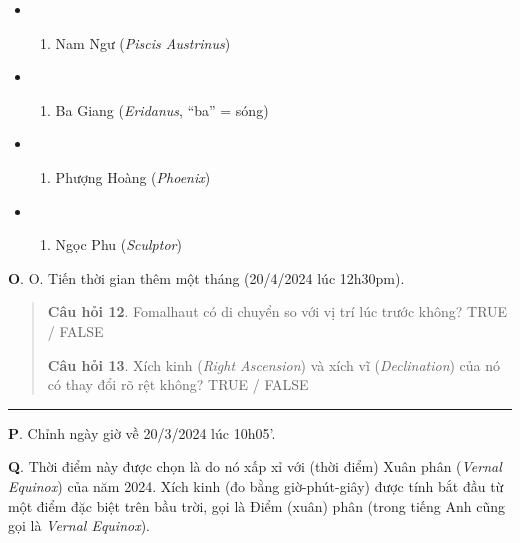 \documentclass[
  a4paper,
]{book}
\providecommand{\tightlist}{%
  \setlength{\itemsep}{0pt}\setlength{\parskip}{0pt}}
\begin{document}
\begin{itemize}
\tightlist
\item
  \begin{enumerate}
  \def\labelenumi{(\Alph{enumi})}
  \tightlist
  \item
    Nam Ngư (\emph{Piscis Austrinus})\\
  \end{enumerate}
\item
  \begin{enumerate}
  \def\labelenumi{(\Alph{enumi})}
  \setcounter{enumi}{1}
  \tightlist
  \item
    Ba Giang (\emph{Eridanus}, ``ba'' = sóng)\\
  \end{enumerate}
\item
  \begin{enumerate}
  \def\labelenumi{(\Alph{enumi})}
  \setcounter{enumi}{2}
  \tightlist
  \item
    Phượng Hoàng (\emph{Phoenix})\\
  \end{enumerate}
\item
  \begin{enumerate}
  \def\labelenumi{(\Alph{enumi})}
  \setcounter{enumi}{3}
  \tightlist
  \item
    Ngọc Phu (\emph{Sculptor})
  \end{enumerate}
\end{itemize}

\textbf{O}. O. Tiến thời gian thêm một tháng (20/4/2024 lúc 12h30pm).

\begin{quote}
\textbf{Câu hỏi 12}. Fomalhaut có di chuyển so với vị trí lúc trước không?
TRUE / FALSE

\textbf{Câu hỏi 13}. Xích kinh (\emph{Right Ascension}) và xích vĩ (\emph{Declination}) của nó có thay đổi rõ rệt không?
TRUE / FALSE
\end{quote}

\begin{center}\rule{0.5\linewidth}{0.5pt}\end{center}

\textbf{P}. Chỉnh ngày giờ về 20/3/2024 lúc 10h05'.

\textbf{Q}. Thời điểm này được chọn là do nó xấp xỉ với (thời điểm) Xuân phân (\emph{Vernal Equinox}) của năm 2024. Xích kinh (đo bằng giờ-phút-giây) được tính bắt đầu từ một điểm đặc biệt trên bầu trời, gọi là Điểm (xuân) phân (trong tiếng Anh cũng gọi là \emph{Vernal Equinox}).
\end{document}
